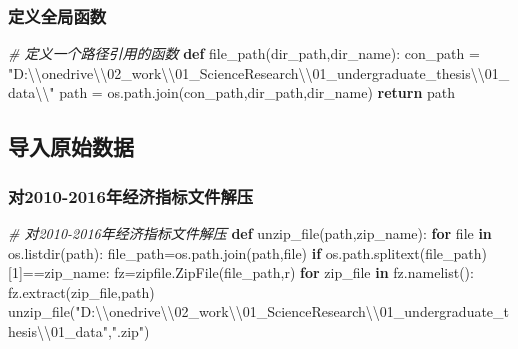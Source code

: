 \documentclass[
]{article}
\newenvironment{Shaded}{}{}
\newcommand{\BuiltInTok}[1]{#1}
\newcommand{\CharTok}[1]{\textcolor[rgb]{0.25,0.44,0.63}{#1}}
\newcommand{\CommentTok}[1]{\textcolor[rgb]{0.38,0.63,0.69}{\textit{#1}}}
\newcommand{\ControlFlowTok}[1]{\textcolor[rgb]{0.00,0.44,0.13}{\textbf{#1}}}
\newcommand{\DecValTok}[1]{\textcolor[rgb]{0.25,0.63,0.44}{#1}}
\newcommand{\KeywordTok}[1]{\textcolor[rgb]{0.00,0.44,0.13}{\textbf{#1}}}
\newcommand{\NormalTok}[1]{#1}
\newcommand{\OperatorTok}[1]{\textcolor[rgb]{0.40,0.40,0.40}{#1}}
\newcommand{\StringTok}[1]{\textcolor[rgb]{0.25,0.44,0.63}{#1}}
\begin{document}
\hypertarget{header-n194}{%
\subsubsection{定义全局函数}\label{header-n194}}

\begin{Shaded}
\begin{Highlighting}[]
\CommentTok{\# 定义一个路径引用的函数}
\KeywordTok{def}\NormalTok{ file\_path(dir\_path,dir\_name):}
\NormalTok{    con\_path }\OperatorTok{=} \StringTok{"D:}\CharTok{\textbackslash{}\textbackslash{}}\StringTok{onedrive}\CharTok{\textbackslash{}\textbackslash{}}\StringTok{02\_work}\CharTok{\textbackslash{}\textbackslash{}}\StringTok{01\_ScienceResearch}\CharTok{\textbackslash{}\textbackslash{}}\StringTok{01\_undergraduate\_thesis}\CharTok{\textbackslash{}\textbackslash{}}\StringTok{01\_data}\CharTok{\textbackslash{}\textbackslash{}}\StringTok{"}
\NormalTok{    path }\OperatorTok{=}\NormalTok{ os.path.join(con\_path,dir\_path,dir\_name)}
    \ControlFlowTok{return}\NormalTok{ path}
\end{Highlighting}
\end{Shaded}

\hypertarget{header-n197}{%
\subsection{导入原始数据}\label{header-n197}}

\hypertarget{header-n198}{%
\subsubsection{对2010-2016年经济指标文件解压}\label{header-n198}}

\begin{Shaded}
\begin{Highlighting}[]
\CommentTok{\# 对2010{-}2016年经济指标文件解压}
\KeywordTok{def}\NormalTok{ unzip\_file(path,zip\_name):}
    \ControlFlowTok{for} \BuiltInTok{file} \KeywordTok{in}\NormalTok{ os.listdir(path):}
\NormalTok{        file\_path}\OperatorTok{=}\NormalTok{os.path.join(path,}\BuiltInTok{file}\NormalTok{)}
        \ControlFlowTok{if}\NormalTok{ os.path.splitext(file\_path)[}\DecValTok{1}\NormalTok{]}\OperatorTok{==}\NormalTok{zip\_name:}
\NormalTok{            fz}\OperatorTok{=}\NormalTok{zipfile.ZipFile(file\_path,}\StringTok{\textquotesingle{}r\textquotesingle{}}\NormalTok{)}
            \ControlFlowTok{for}\NormalTok{ zip\_file }\KeywordTok{in}\NormalTok{ fz.namelist():}
\NormalTok{                fz.extract(zip\_file,path)}
\NormalTok{unzip\_file(}\StringTok{"D:}\CharTok{\textbackslash{}\textbackslash{}}\StringTok{onedrive}\CharTok{\textbackslash{}\textbackslash{}}\StringTok{02\_work}\CharTok{\textbackslash{}\textbackslash{}}\StringTok{01\_ScienceResearch}\CharTok{\textbackslash{}\textbackslash{}}\StringTok{01\_undergraduate\_thesis}\CharTok{\textbackslash{}\textbackslash{}}\StringTok{01\_data"}\NormalTok{,}\StringTok{".zip"}\NormalTok{)}
\end{Highlighting}
\end{Shaded}
\end{document}
